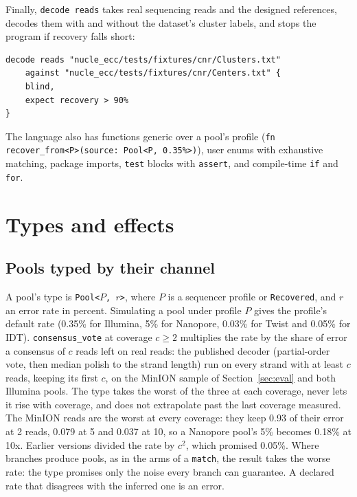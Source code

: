 \documentclass[11pt,a4paper]{article}
\newcommand{\nsl}[1]{\texttt{#1}}
\begin{document}
Finally, \nsl{decode reads} takes real sequencing reads and the designed
references, decodes them with and without the dataset's cluster labels,
and stops the program if recovery falls short:

\begin{lstlisting}[caption={Decoding real MinION reads (\texttt{real\_reads.nsl}, with paths from the repository root).},label=lst:reads]
decode reads "nucle_ecc/tests/fixtures/cnr/Clusters.txt"
    against "nucle_ecc/tests/fixtures/cnr/Centers.txt" {
    blind,
    expect recovery > 90%
}
\end{lstlisting}

The language also has functions generic over a pool's profile
(\nsl{fn recover\_from<P>(source: Pool<P, 0.35\%>)}), user enums with
exhaustive matching, package imports, \nsl{test} blocks with
\nsl{assert}, and compile-time \nsl{if} and \nsl{for}.

\section{Types and effects}
\label{sec:types}

\subsection{Pools typed by their channel}

A pool's type is \nsl{Pool<}$P$\nsl{, }$r$\nsl{>}, where $P$ is a
sequencer profile or \nsl{Recovered}, and $r$ an error rate in percent.
Simulating a pool under profile $P$ gives the profile's default rate
(0.35\% for Illumina, 5\% for Nanopore, 0.03\% for Twist and 0.05\% for
IDT). \nsl{consensus\_vote} at coverage $c \ge 2$ multiplies the rate by
the share of error a consensus of $c$ reads left on real reads: the
published decoder (partial-order vote, then median polish to the strand
length) run on every strand with at least $c$ reads, keeping its first
$c$, on the MinION sample of Section~\ref{sec:eval} and both Illumina
pools. The type takes the worst of the three at each coverage, never lets
it rise with coverage, and does not extrapolate past the last coverage
measured. The MinION reads are the worst at every coverage: they keep
0.93 of their error at 2 reads, 0.079 at 5 and 0.037 at 10, so a
Nanopore pool's 5\% becomes 0.18\% at 10x. Earlier versions divided the
rate by $c^2$, which promised 0.05\%. Where branches produce pools,
as in the arms of a \nsl{match}, the result takes the worse rate: the
type promises only the noise every branch can guarantee. A declared rate
that disagrees with the inferred one is an error.
\end{document}
